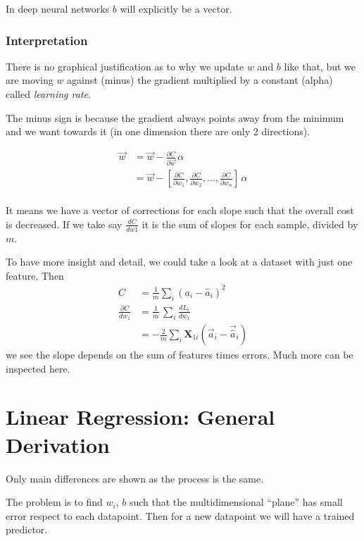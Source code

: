 In deep neural networks $b$ will explicitly be a vector.

\subsubsection{Interpretation}

There is no graphical justification as to why we update $w$ and $b$ like that, but we are moving $w$ against (minus) the gradient multiplied by a constant (alpha) called \textit{learning rate}.

The minus sign is because the gradient always points away from the minimum and we want towards it (in one dimension there are only 2 directions). 

\begin{align}
  \vec{w} &= \vec{w} -\frac{\partial C}{\partial \vec{w}}\,\alpha\\
  &= \vec{w} -[\frac{\partial C}{\partial w_1}, \frac{\partial C}{\partial w_2},\ldots, \frac{\partial C}{\partial w_n}]\,\alpha\\
\end{align}

It means we have a vector of corrections for each slope such that the overall cost is decreased. If we take say $\frac{dC}{dw1}$ it is the sum of slopes for each sample, divided by $m$. 

To have more insight and detail, we could take a look at a dataset with just one feature. Then 
\begin{align*}
  C &= \frac{1}{m}\sum_i(a_i - \hat{a}_i)^2 \\ 
  \frac{\partial C}{dw_1}&= \frac{1}{m}\,\sum_i \frac{dL_i}{dw_1} \\
  &= -\frac{2}{m}\sum_i \mathbf{X}_{1i}(\vec{a}_i-\vec{\hat{a}}_i)
\end{align*}
we see the slope depends on the sum of features times errors. Much more can be inspected here.


\section{Linear Regression: General Derivation}
Only main differences are shown as the process is the same.

The problem is to find $w_i$, $b$ such that the multidimensional ``plane'' has small error respect to each datapoint. Then for a new datapoint we will have a trained predictor.

